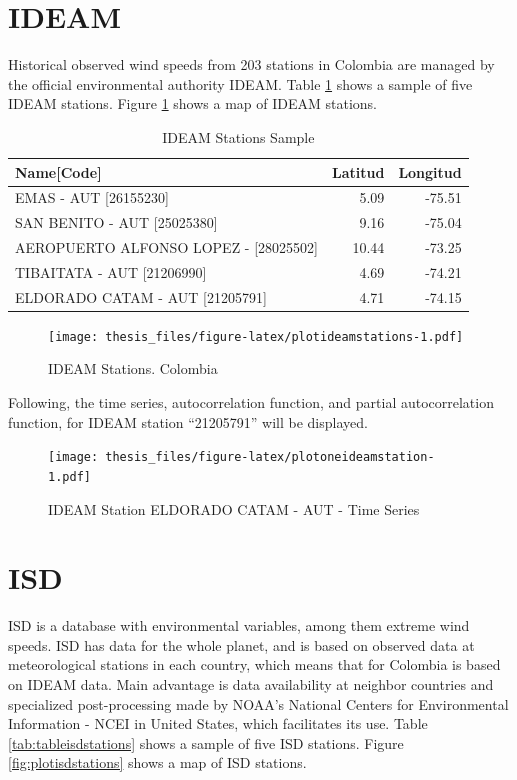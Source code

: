 \documentclass[12pt,oneside]{reedthesis}
\begin{document}
\hypertarget{ideam}{%
\section{IDEAM}\label{ideam}}

Historical observed wind speeds from 203 stations in Colombia are managed by the official environmental authority IDEAM. Table \ref{tab:tableideamstations} shows a sample of five IDEAM stations. Figure \ref{fig:plotideamstations} shows a map of IDEAM stations.

\begingroup\fontsize{10}{12}\selectfont
\begin{longtable}[t]{lrr}
\caption[IDEAM Stations sample]{\label{tab:tableideamstations}IDEAM Stations Sample}\\
\toprule
Name[Code] & Latitud & Longitud\\
\midrule
EMAS - AUT [26155230] & 5.09 & -75.51\\
SAN BENITO - AUT [25025380] & 9.16 & -75.04\\
AEROPUERTO ALFONSO LOPEZ - [28025502] & 10.44 & -73.25\\
TIBAITATA - AUT [21206990] & 4.69 & -74.21\\
ELDORADO CATAM - AUT [21205791] & 4.71 & -74.15\\
\bottomrule
\end{longtable}
\endgroup{}
\begin{figure}
\centering
\texttt{[image: thesis\_files/figure-latex/plotideamstations-1.pdf]}
\caption{\label{fig:plotideamstations}IDEAM Stations. Colombia}
\end{figure}
Following, the time series, autocorrelation function, and partial autocorrelation function, for IDEAM station ``21205791'' will be displayed.
\begin{figure}
\centering
\texttt{[image: thesis\_files/figure-latex/plotoneideamstation-1.pdf]}
\caption{\label{fig:plotoneideamstation}IDEAM Station ELDORADO CATAM - AUT - Time Series}
\end{figure}
\hypertarget{isd}{%
\section{ISD}\label{isd}}

ISD is a database with environmental variables, among them extreme wind speeds. ISD has data for the whole planet, and is based on observed data at meteorological stations in each country, which means that for Colombia is based on IDEAM data. Main advantage is data availability at neighbor countries and specialized post-processing made by NOAA's National Centers for Environmental Information - NCEI in United States, which facilitates its use. Table \ref{tab:tableisdstations} shows a sample of five ISD stations. Figure \ref{fig:plotisdstations} shows a map of ISD stations.
\end{document}
